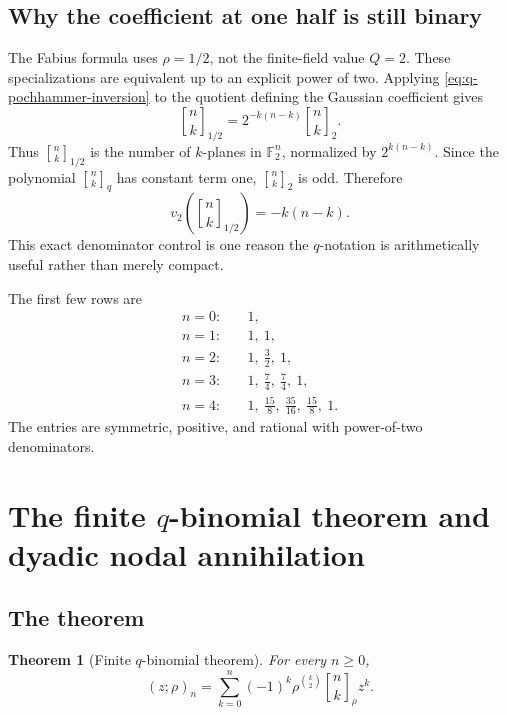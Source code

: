 \documentclass[11pt]{article}
\newtheorem{theorem}{Theorem}[section]
\theoremstyle{definition}
\newcommand{\qpoch}[3]{\left(#1;#2\right)_{#3}}
\newcommand{\Qbin}[3]{\genfrac{[}{]}{0pt}{}{#1}{#2}_{#3}}
\begin{document}
\subsection{Why the coefficient at one half is still binary}

The Fabius formula uses $\rho=1/2$, not the finite-field value $Q=2$.  These specializations are equivalent up to an explicit power of two.  Applying \cref{eq:q-pochhammer-inversion} to the quotient defining the Gaussian coefficient gives
\begin{equation}
  \Qbin{n}{k}{1/2}
  =2^{-k(n-k)}\Qbin{n}{k}{2}.
  \label{eq:half-vs-two-gaussian}
\end{equation}
Thus $\Qbin{n}{k}{1/2}$ is the number of $k$-planes in $\mathbb F_2^n$, normalized by $2^{k(n-k)}$.  Since the polynomial $\Qbin{n}{k}{q}$ has constant term one, $\Qbin{n}{k}{2}$ is odd.  Therefore
\begin{equation}
  v_2\!\left(\Qbin{n}{k}{1/2}\right)=-k(n-k).
  \label{eq:half-gaussian-valuation}
\end{equation}
This exact denominator control is one reason the $q$-notation is arithmetically useful rather than merely compact.

The first few rows are
\begin{align*}
  n=0:&\quad 1,\\
  n=1:&\quad 1,\ 1,\\
  n=2:&\quad 1,\ \frac32,\ 1,\\
  n=3:&\quad 1,\ \frac74,\ \frac74,\ 1,\\
  n=4:&\quad 1,\ \frac{15}{8},\ \frac{35}{16},\ \frac{15}{8},\ 1.
\end{align*}
The entries are symmetric, positive, and rational with power-of-two denominators.

\section{The finite \texorpdfstring{$q$}{q}-binomial theorem and dyadic nodal annihilation}
\label{sec:finite-q-binomial}

\subsection{The theorem}

\begin{theorem}[Finite $q$-binomial theorem]
For every $n\ge0$,
\begin{equation}
  \qpoch{z}{\rho}{n}
  =\sum_{k=0}^{n}(-1)^k\rho^{\binom{k}{2}}
     \Qbin{n}{k}{\rho}z^k.
  \label{eq:finite-q-binomial}
\end{equation}
\end{theorem}
\end{document}

